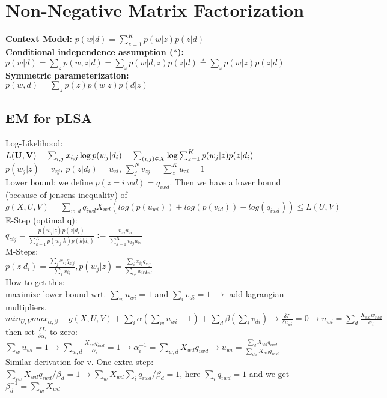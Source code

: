 \section{Non-Negative Matrix Factorization}
\textbf{Context Model:} $p(w | d) = \sum_{z=1}^K p(w | z) p(z | d)$\\
\textbf{Conditional independence assumption ($*$):}\\
$p(w|d) = \sum_z p(w,z|d) = \sum_z p(w|d,z)p(z|d) \stackrel{*}{=} \sum_z p(w|z)p(z|d)$\\
\textbf{Symmetric parameterization:}\\
$p(w, d) = \sum_z p(z)p(w | z) p(d | z)$

\subsection*{EM for pLSA}
Log-Likelihood: $L(\mathbf{U}, \mathbf{V}) = \sum_{i,j} x_{i,j}\log p(w_j|d_i) \\
= \sum_{(i,j) \in X} \log \sum_{z=1}^K p(w_j|z)p(z|d_i)$ \\ 
$ p(w_j|z) = v_{zj}$, $p(z|d_i) = u_{zi}$, $\sum_j^N v_{zj} = \sum_z^K u_{zi} = 1$\\
Lower bound: we define $p(z=i|wd) = q_{iwd}$. Then we have a lower bound (because of jensens inequality) of $g(X,U,V) =  \sum_{w,d}q_{iwd}X_{wd}(log(p(u_{wi}))+log(p(v_{id}))-log(q_{iwd}))\leq L(U,V)$ \\
E-Step (optimal q):\\
$q_{zij} = \frac{p(w_j|z)p(z|d_i)}{\sum_{k=1}^K p(w_j|k)p(k|d_i)} := \frac{v_{zj}u_{zi}}{\sum_{k=1}^K v_{kj}u_{ki}}$\\
M-Steps:\\
$p(z|d_i) = \frac{\sum_j x_{ij}q_{zij}}{\sum_j x_{ij}}, p(w_j|z) = \frac{\sum_i x_{ij}q_{zij}}{\sum_{i,l}x_{il}q_{zil}}$\\
How to get this: \\
maximize lower bound wrt. $\sum_w u_{wi} = 1$ and $\sum_i v_{di}=1$ $\rightarrow$ add lagrangian multipliers. $min_{U,V}max_{\alpha,\beta}-g(X,U,V)+\sum_i \alpha (\sum_w u_{wi}-1)+ \sum_d \beta(\sum_i v_{di}) \rightarrow \frac{\delta L}{\delta u_{wi}} = 0 \rightarrow u_{wi} = \sum_d \frac{X_{wd}w_{iwd}}{\alpha_i}$ then set $\frac{\delta L}{\delta \alpha_i}$ to zero: $\sum_w u_{wi} = 1 \rightarrow \sum_{w,d}\frac{X_{wd}q_{iwd}}{\alpha_i}= 1 \rightarrow \alpha_i^{-1} = \sum_{w,d} X_{wd}q_{iwd} \rightarrow u_{wi} = \frac{\sum_d X_{wd}q_{iwd}}{\sum_{dw}X_{wd}q_{iwd}}$ Similar derivation for v. One extra step: $\sum_{iw}X_{wd}q_{iwd}/\beta_d = 1 \rightarrow \sum_w X_{wd} \sum_i q_{iwd} / \beta_d = 1$, here $\sum_i q_{iwd} = 1$ and we get $\beta_d^{-1} = \sum_w X_{wd}$

